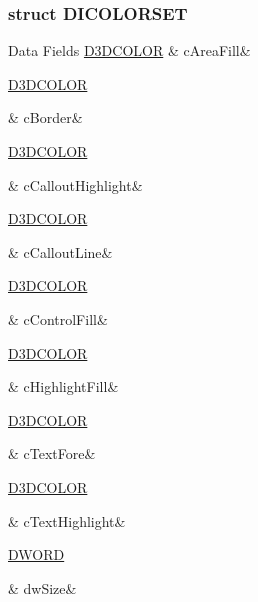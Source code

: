 \subsubsection{struct D\-I\-C\-O\-L\-O\-R\-S\-E\-T}
\begin{DoxyFields}{Data Fields}
\hypertarget{a00003_a198aee943eef9b9734785bcf4629ff86}{\hyperlink{a00003_ac8e0e7c9369d051cd9882da44531c42c}{D3\-D\-C\-O\-L\-O\-R}}\label{a00003_a198aee943eef9b9734785bcf4629ff86}
&
c\-Area\-Fill&
\\
\hline

\hypertarget{a00003_a36f5a9696c6eebfcffbe3799f1f2057f}{\hyperlink{a00003_ac8e0e7c9369d051cd9882da44531c42c}{D3\-D\-C\-O\-L\-O\-R}}\label{a00003_a36f5a9696c6eebfcffbe3799f1f2057f}
&
c\-Border&
\\
\hline

\hypertarget{a00003_a49cef7d919ed0c27bec6bc97b0473055}{\hyperlink{a00003_ac8e0e7c9369d051cd9882da44531c42c}{D3\-D\-C\-O\-L\-O\-R}}\label{a00003_a49cef7d919ed0c27bec6bc97b0473055}
&
c\-Callout\-Highlight&
\\
\hline

\hypertarget{a00003_aa54df6e294fec825e2cee5fa8bd69998}{\hyperlink{a00003_ac8e0e7c9369d051cd9882da44531c42c}{D3\-D\-C\-O\-L\-O\-R}}\label{a00003_aa54df6e294fec825e2cee5fa8bd69998}
&
c\-Callout\-Line&
\\
\hline

\hypertarget{a00003_a41448f3bb3998655e6296b77da2f9d82}{\hyperlink{a00003_ac8e0e7c9369d051cd9882da44531c42c}{D3\-D\-C\-O\-L\-O\-R}}\label{a00003_a41448f3bb3998655e6296b77da2f9d82}
&
c\-Control\-Fill&
\\
\hline

\hypertarget{a00003_a6717a3893a9865533e4886735894ec8a}{\hyperlink{a00003_ac8e0e7c9369d051cd9882da44531c42c}{D3\-D\-C\-O\-L\-O\-R}}\label{a00003_a6717a3893a9865533e4886735894ec8a}
&
c\-Highlight\-Fill&
\\
\hline

\hypertarget{a00003_a0ce9121862024dfd8ee6a23a254512cb}{\hyperlink{a00003_ac8e0e7c9369d051cd9882da44531c42c}{D3\-D\-C\-O\-L\-O\-R}}\label{a00003_a0ce9121862024dfd8ee6a23a254512cb}
&
c\-Text\-Fore&
\\
\hline

\hypertarget{a00003_a85530ddf9ea55b5cec04b5e3766c5925}{\hyperlink{a00003_ac8e0e7c9369d051cd9882da44531c42c}{D3\-D\-C\-O\-L\-O\-R}}\label{a00003_a85530ddf9ea55b5cec04b5e3766c5925}
&
c\-Text\-Highlight&
\\
\hline

\hypertarget{a00003_a669c5a85f5a9eb97e64ad880fadaaa2d}{\hyperlink{a00003_a50e15ae51c87ae06ab29c8148cb5f36c}{D\-W\-O\-R\-D}}\label{a00003_a669c5a85f5a9eb97e64ad880fadaaa2d}
&
dw\-Size&
\\
\hline

\end{DoxyFields}
\label{d9/d73/a00060}
\hypertarget{a00003_d9/d73/a00060}{}
